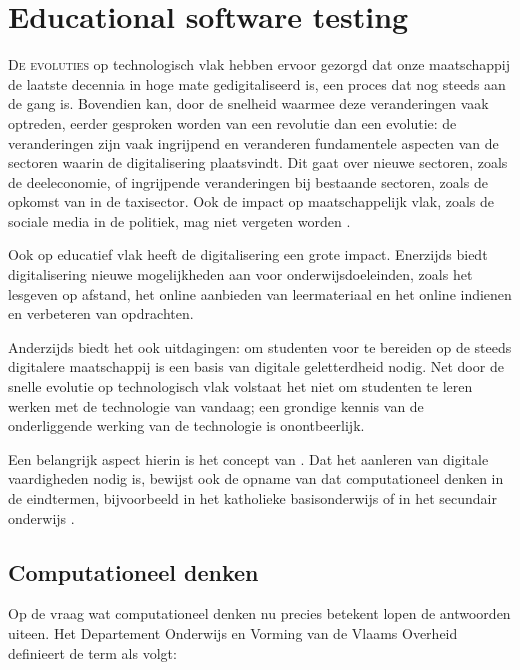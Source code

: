 \chapter{Educational software testing}\label{ch:dodona}

\lettrine{D}{e evoluties} op technologisch vlak hebben ervoor gezorgd dat onze maatschappij de laatste decennia in hoge mate gedigitaliseerd is, een proces dat nog steeds aan de gang is.
Bovendien kan, door de snelheid waarmee deze veranderingen vaak optreden, eerder gesproken worden van een revolutie dan een evolutie: de veranderingen zijn vaak ingrijpend en veranderen fundamentele aspecten van de sectoren waarin de digitalisering plaatsvindt.
Dit gaat over nieuwe sectoren, zoals de deeleconomie, of ingrijpende veranderingen bij bestaande sectoren, zoals de opkomst van  in de taxisector.
Ook de impact op maatschappelijk vlak, zoals de sociale media in de politiek, mag niet vergeten worden \autocite{hipeac2019}.

Ook op educatief vlak heeft de digitalisering een grote impact.
Enerzijds biedt digitalisering nieuwe mogelijkheden aan voor onderwijsdoeleinden, zoals het lesgeven op afstand, het online aanbieden van leermateriaal en het online indienen en verbeteren van opdrachten.

Anderzijds biedt het ook uitdagingen: om studenten voor te bereiden op de steeds digitalere maatschappij is een basis van digitale geletterdheid nodig.
Net door de snelle evolutie op technologisch vlak volstaat het niet om studenten te leren werken met de technologie van vandaag;
een grondige kennis van de onderliggende werking van de technologie is onontbeerlijk.

Een belangrijk aspect hierin is het concept van .
Dat het aanleren van digitale vaardigheden nodig is, bewijst ook de opname van dat computationeel denken in de eindtermen, bijvoorbeeld in het katholieke basisonderwijs \autocite{zinin2017} of in het secundair onderwijs \autocite{2019040867}.

\section{Computationeel denken}\label{sec:computationeel-denken}

Op de vraag wat computationeel denken nu precies betekent lopen de antwoorden uiteen.
Het Departement Onderwijs en Vorming van de Vlaams Overheid \autocite{bastiaensen2017} definieert de term als volgt:

